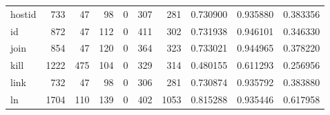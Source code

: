 \begin{tabular}{lrrrrrrrrr}
hostid    &                                                733 &                                                 47 &                                                 98 &                                                  0 &                                                307 &                                                281 &                                           0.730900 &                               0.935880 &                             0.383356 \\
id        &                                                872 &                                                 47 &                                                112 &                                                  0 &                                                411 &                                                302 &                                           0.731938 &                               0.946101 &                             0.346330 \\
join      &                                                854 &                                                 47 &                                                120 &                                                  0 &                                                364 &                                                323 &                                           0.733021 &                               0.944965 &                             0.378220 \\
kill      &                                               1222 &                                                475 &                                                104 &                                                  0 &                                                329 &                                                314 &                                           0.480155 &                               0.611293 &                             0.256956 \\
link      &                                                732 &                                                 47 &                                                 98 &                                                  0 &                                                306 &                                                281 &                                           0.730874 &                               0.935792 &                             0.383880 \\
ln        &                                               1704 &                                                110 &                                                139 &                                                  0 &                                                402 &                                               1053 &                                           0.815288 &                               0.935446 &                             0.617958 \\

\end{tabular}
